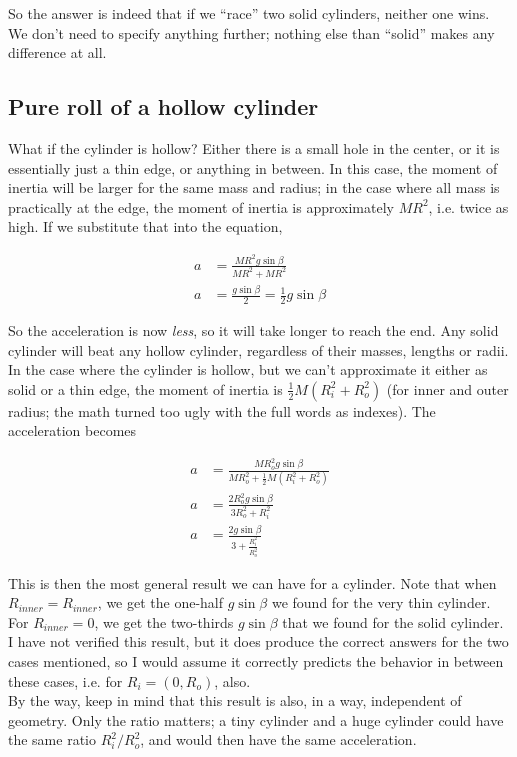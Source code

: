 So the answer is indeed that if we ``race'' two solid cylinders, neither one wins. We don't need to specify anything further; nothing else than ``solid'' makes any difference at all.

\subsection{Pure roll of a hollow cylinder}

What if the cylinder is hollow? Either there is a small hole in the center, or it is essentially just a thin edge, or anything in between. In this case, the moment of inertia will be larger for the same mass and radius; in the case where all mass is practically at the edge, the moment of inertia is approximately $M R^2$, i.e. twice as high. If we substitute that into the equation,

\begin{align}
a &= \frac{M R^2 g \sin \beta}{M R^2 + M R^2}\\
a &= \frac{g \sin \beta}{2} = \frac{1}{2} g \sin \beta
\end{align}

So the acceleration is now \emph{less}, so it will take longer to reach the end. Any solid cylinder will beat any hollow cylinder, regardless of their masses, lengths or radii.\\
In the case where the cylinder is hollow, but we can't approximate it either as solid or a thin edge, the moment of inertia is $\frac{1}{2} M(R_i^2 + R_o^2)$ (for inner and outer radius; the math turned too ugly with the full words as indexes). The acceleration becomes

\begin{align}
a &= \frac{M R_o^2 g \sin \beta}{M R_o^2 + \frac{1}{2} M (R_i^2 + R_o^2)}\\
a &= \frac{2 R_o^2 g \sin \beta}{3 R_o^2 + R_i^2}\\
a &= \frac{2 g \sin \beta}{3 + \frac{R_i^2}{R_o^2}}
\end{align}

This is then the most general result we can have for a cylinder. Note that when $R_{inner} = R_{inner}$, we get the one-half $g \sin\beta$ we found for the very thin cylinder. For $R_{inner} = 0$, we get the two-thirds $g \sin \beta$ that we found for the solid cylinder. I have not verified this result, but it does produce the correct answers for the two cases mentioned, so I would assume it correctly predicts the behavior in between these cases, i.e. for $R_i = (0, R_o)$, also.\\
By the way, keep in mind that this result is also, in a way, independent of geometry. Only the ratio matters; a tiny cylinder and a huge cylinder could have the same ratio $R_i^2/R_o^2$, and would then have the same acceleration.

